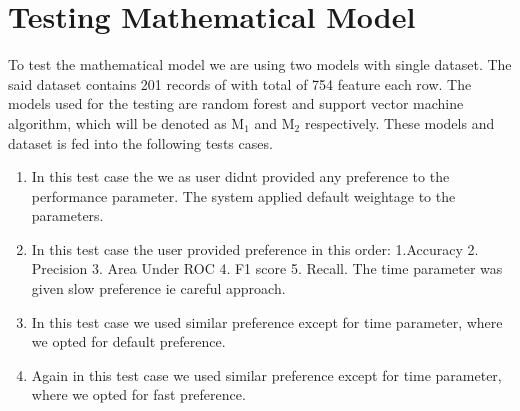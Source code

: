%

\section{Testing Mathematical Model}\label{sec:testing_mathematical_model}

To test the mathematical model we are using two models with single dataset. The said dataset contains 201 records of with total of 754 feature each row. The models used for the testing are random forest and support vector machine algorithm, which will be denoted as M$_1$ and M$_2$ respectively. These models and dataset is fed into the following tests cases.

\begin{enumerate}[label=\textbf{CASE \Roman*:},leftmargin=*,align=left]
  \item In this test case the we as user didnt provided any preference to the performance parameter. The system applied default weightage to the parameters.
  \item In this test case the user provided preference in this order: 1.Accuracy 2. Precision 3. Area Under ROC 4. F1 score 5. Recall. The time parameter was given slow preference ie careful approach.
  \item In this test case we used similar preference except for time parameter, where we opted for default preference.
  \item Again in this test case we used similar preference except for time parameter, where we opted for fast preference.
\end{enumerate}


